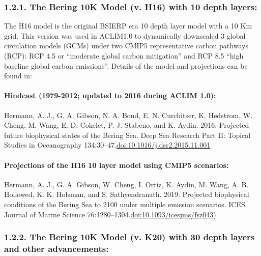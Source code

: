 \documentclass[
]{article}
\begin{document}
\hypertarget{the-bering-10k-model-v.-h16-with-10-depth-layers}{%
\subsubsection{1.2.1. The Bering 10K Model (v. H16) with 10 depth
layers:}\label{the-bering-10k-model-v.-h16-with-10-depth-layers}}

The H16 model is the original BSIERP era 10 depth layer model with a 10
Km grid. This version was used in ACLIM1.0 to dynamically downscaled 3
global circulation models (GCMs) under two CMIP5 representative carbon
pathways (RCP): RCP 4.5 or ``moderate global carbon mitigation'' and RCP
8.5 ``high baseline global carbon emissions''. Details of the model and
projections can be found in:

\hypertarget{hindcast-1979-2012-updated-to-2016-during-aclim-1.0}{%
\paragraph{Hindcast (1979-2012; updated to 2016 during ACLIM
1.0):}\label{hindcast-1979-2012-updated-to-2016-during-aclim-1.0}}

Hermann, A. J., G. A. Gibson, N. A. Bond, E. N. Curchitser, K. Hedstrom,
W. Cheng, M. Wang, E. D. Cokelet, P. J. Stabeno, and K. Aydin. 2016.
Projected future biophysical states of the Bering Sea. Deep Sea Research
Part II: Topical Studies in Oceanography
134:30--47.\href{http://dx.doi.org/10.1016/j.dsr2.2015.11.001}{doi:10.1016/j.dsr2.2015.11.001}

\hypertarget{projections-of-the-h16-10-layer-model-using-cmip5-scenarios}{%
\paragraph{Projections of the H16 10 layer model using CMIP5
scenarios:}\label{projections-of-the-h16-10-layer-model-using-cmip5-scenarios}}

Hermann, A. J., G. A. Gibson, W. Cheng, I. Ortiz, K. Aydin, M. Wang, A.
B. Hollowed, K. K. Holsman, and S. Sathyendranath. 2019. Projected
biophysical conditions of the Bering Sea to 2100 under multiple emission
scenarios. ICES Journal of Marine Science
76:1280--1304.\href{https://academic.oup.com/icesjms/article/76/5/1280/5477847?login=true}{doi:10.1093/icesjms/fsz043})

\hypertarget{the-bering-10k-model-v.-k20-with-30-depth-layers-and-other-advancements}{%
\subsubsection{1.2.2. The Bering 10K Model (v. K20) with 30 depth layers
and other
advancements:}\label{the-bering-10k-model-v.-k20-with-30-depth-layers-and-other-advancements}}
\end{document}
